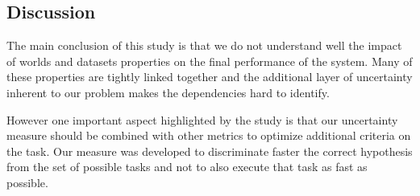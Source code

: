 
\subsection{Discussion}

The main conclusion of this study is that we do not understand well the impact of worlds and datasets properties on the final performance of the system. Many of these properties are tightly linked together and the additional layer of uncertainty inherent to our problem makes the dependencies hard to identify.

However one important aspect highlighted by the study is that our uncertainty measure should be combined with other metrics to optimize additional criteria on the task. Our measure was developed to discriminate faster the correct hypothesis from the set of possible tasks and not to also execute that task as fast as possible.

